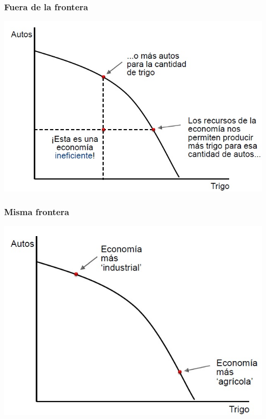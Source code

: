 \documentclass{beamer}
\begin{document}
\begin{frame}
\frametitle{Fuera de la frontera}
\begin{center}
    \includegraphics[scale=0.6]{../Tema_11.5_fueradelafrontera.jpg}
\end{center}
\end{frame}

\begin{frame}
\frametitle{Misma frontera}
\begin{center}
    \includegraphics[scale=0.6]{../Tema_11.6_lamismafrontera.jpg}
\end{center}
\end{frame}
\end{document}
